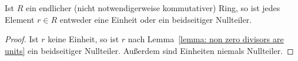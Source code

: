 \begin{corollary}
  Ist $R$ ein endlicher \textup(nicht notwendigerweise kommutativer\textup) Ring, so ist jedes Element $r \in R$ entweder eine Einheit oder ein beidseitiger Nullteiler.
\end{corollary}

\begin{proof}
  Ist $r$ keine Einheit, so ist $r$ nach Lemma~\ref{lemma: non zero divisors are units} ein beidseitiger Nullteiler.
  Außerdem sind Einheiten niemals Nullteiler.
\end{proof}





\addtocounter{subsection}{1}





\addtocounter{subsection}{1}





\addtocounter{subsection}{1}





\addtocounter{subsection}{1}





\addtocounter{subsection}{1}




